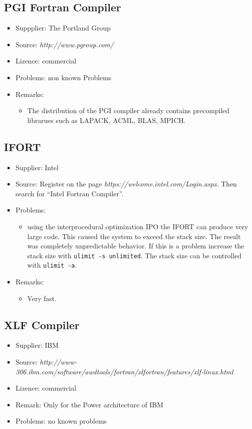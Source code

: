 \documentclass[a4paper,10pt]{report}
\newcommand{\mytt}[1]{{\tt #1}}
\begin{document}
\subsection{PGI Fortran Compiler}
\begin{itemize}
\item Suppplier: The Portland Group
\item Source: \textit{http://www.pgroup.com/}
\item Lizence: commercial
\item Problems: non known Problems
\item Remarks:
\begin{itemize}
\item The distribution of the PGI compiler already contains
precompiled librarues such as LAPACK, ACML, BLAS, MPICH.
\end{itemize}
\end{itemize}

\subsection{IFORT}
\begin{itemize}
\item Supplier: Intel
\item Source: Register on the page \textit{https://welcome.intel.com/Login.aspx}.
Then search for  ``Intel Fortran Compiler''.
\item Problems: 
\begin{itemize}
\item using the interprocedural optimization IPO the IFORT can produce
very large code. This caused the system to exceed the stack size. The
result was completely unpredictable behavior. If this is a problem
increase the stack size with \mytt{ulimit -s unlimited}. The stack
size can be controlled with \mytt{ulimit -a}.
\end{itemize}
\item Remarks:
\begin{itemize}
\item Very fast.
\end{itemize}
\end{itemize}


\subsection{XLF Compiler}
\begin{itemize}
\item Supplier: IBM
\item Source: \textit{http://www-306.ibm.com/software/awdtools/fortran/xlfortran/features/xlf-linux.html}
\item Lizence: commercial
\item Remark: Only for the Power architecture of IBM
\item Problems: no known problems
\end{itemize}
\end{document}
